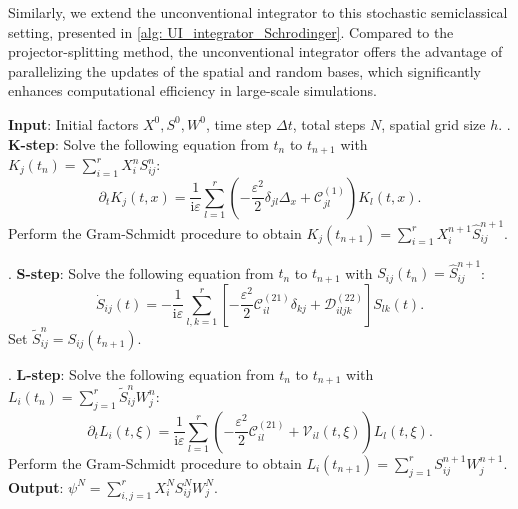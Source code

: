 \documentclass[preprint,11pt]{elsarticle}
\begin{document}
Similarly, we extend the unconventional integrator to this stochastic semiclassical setting, presented in \cref{alg: UI_integrator_Schrodinger}. Compared to the projector-splitting method, the unconventional integrator offers the advantage of parallelizing the updates of the spatial and random bases, which significantly enhances computational efficiency in large-scale simulations.

\begin{algorithm}[htbp]
    \caption{The projector splitting integrator for the semiclassical Schrödinger equation with uncertainties}
    \label{alg: PS_integrator_Schrodinger}
    \begin{algorithmic}[1]
        \STATE \textbf{Input}: Initial factors $X^0, S^0, W^0$, time step $\Delta t$, total steps $N$, spatial grid size $h$.
            . \textbf{K-step}: Solve the following equation from $t_n$ to $t_{n+1}$ with $K_j(t_n) = \sum_{i=1}^r X_i^n S_{ij}^n$:
            \begin{equation*}
                \partial_t K_j(t,x) = \frac{1}{\mathrm{i}\varepsilon} \sum_{l=1}^r \left( -\frac{\varepsilon^2}{2} \delta_{jl} \Delta_x + \mathcal{C}_{jl}^{(1)} \right) K_l(t,x).
            \end{equation*}
            Perform the Gram-Schmidt procedure to obtain $K_j(t_{n+1}) = \sum_{i=1}^r X_i^{n+1} \widehat{S}_{ij}^{n+1}$.
            
            . \textbf{S-step}: Solve the following equation from $t_n$ to $t_{n+1}$ with $S_{ij}(t_n) = \widehat{S}_{ij}^{n+1}$:
            \begin{equation*}
                \dot{S}_{ij}(t) = -\frac{1}{\mathrm{i}\varepsilon} \sum_{l,k=1}^r \left[ -\frac{\varepsilon^2}{2} \mathcal{C}_{il}^{(21)} \delta_{kj} + \mathcal{D}_{iljk}^{(22)} \right] S_{lk}(t).
            \end{equation*}
            Set $\widetilde{S}_{ij}^{n} = S_{ij}(t_{n+1})$.
            
            . \textbf{L-step}: Solve the following equation from $t_n$ to $t_{n+1}$ with $L_i(t_n) = \sum_{j=1}^r \widetilde{S}_{ij}^{n} W_j^n$:
            \begin{equation*}
                \partial_t L_i(t,\xi) = \frac{1}{\mathrm{i}\varepsilon} \sum_{l=1}^r \left( -\frac{\varepsilon^2}{2} \mathcal{C}_{il}^{(21)} + \mathcal{V}_{il}(t, \xi) \right) L_l(t,\xi).
            \end{equation*}
            Perform the Gram-Schmidt procedure to obtain $L_i(t_{n+1}) = \sum_{j=1}^r S_{ij}^{n+1} W_j^{n+1}$.
        \ENDFOR
        \STATE \textbf{Output}: $\psi^N = \sum_{i,j=1}^r X_i^N S_{ij}^N W_j^N$.
    \end{algorithmic}
\end{algorithm}
\end{document}
